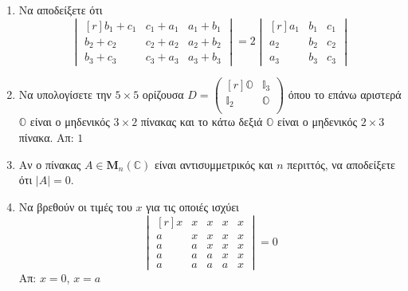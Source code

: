 \begin{enumerate}
  \item Να αποδείξετε ότι
    \[
      \begin{vmatrix*}[r]
        b_{1}+ c_{1} & c_{1}+ a_{1} & a_{1}+ b_{1} \\
        b_{2}+ c_{2} & c_{2}+ a_{2} & a_{2}+ b_{2} \\
        b_{3}+ c_{3} & c_{3}+ a_{3} & a_{3}+ b_{3} 
      \end{vmatrix*} = 2 
      \begin{vmatrix*}[r]
        a_{1}& b_{1}& c_{1} \\
        a_{2}& b_{2}& c_{2} \\
        a_{3}& b_{3}& c_{3} 
      \end{vmatrix*}
    \]

  \item Να υπολογίσετε την $ 5\times 5$ ορίζουσα $ D = 
    \begin{pmatrix*}[r]
    \mathbb{O} & \mathbb{I}_{3} \\
  \mathbb{I}_{2} & \mathbb{O} \\
\end{pmatrix*} $ όπου το επάνω αριστερά $ \mathbb{O} $ είναι ο μηδενικός $ 3\times 2 $ 
πίνακας και το κάτω δεξιά $ \mathbb{O} $ είναι ο μηδενικός $ 2\times 3 $ πίνακα.
\hfill Απ: $ 1 $ 

\item Αν ο πίνακας $ A \in \textbf{M}_{n}(\mathbb{C}) $ είναι αντισυμμετρικός 
  και $n$ περιττός, να αποδείξετε ότι $ |A|=0 $.

\item Να βρεθούν οι τιμές του $ x $ για τις οποιές ισχύει
  \[
    \begin{vmatrix*}[r]
      x & x & x & x & x \\
      a & x & x & x & x \\
      a & a & x & x & x \\
      a & a & a & x & x \\
      a & a & a & a & x
    \end{vmatrix*} = 0
   \]
   \hfill Απ: $ x=0 $, $ x=a $  
\end{enumerate}




